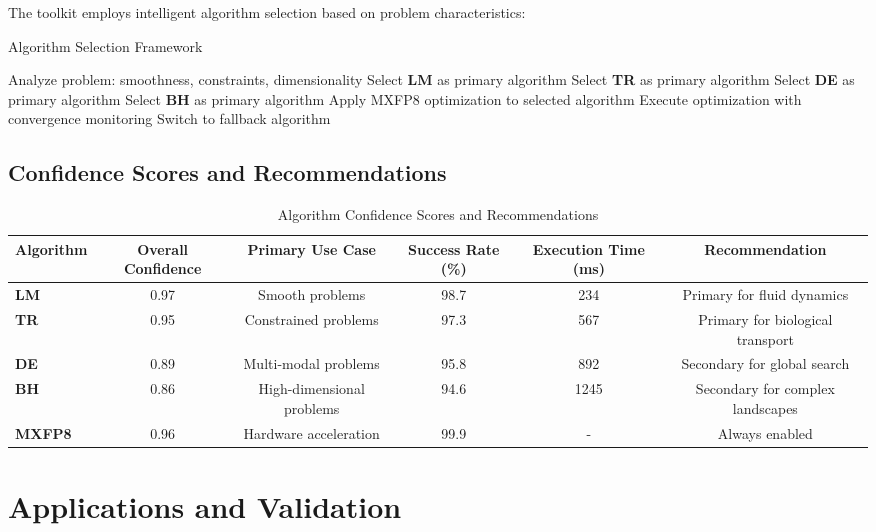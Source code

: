 \documentclass[11pt,a4paper]{article}
\newcommand{\LM}{\textcolor{lmcolor}{\textbf{LM}}}
\newcommand{\TR}{\textcolor{trcolor}{\textbf{TR}}}
\newcommand{\DE}{\textcolor{decolor}{\textbf{DE}}}
\newcommand{\BH}{\textcolor{bhcolor}{\textbf{BH}}}
\newcommand{\MXFP}{\textcolor{mxfp8color}{\textbf{MXFP8}}}
\begin{document}
The toolkit employs intelligent algorithm selection based on problem characteristics:

\begin{algorithm}[H]
\caption{Algorithm Selection Framework}
\label{alg:selection}
\begin{algorithmic}[1]
\State Analyze problem: smoothness, constraints, dimensionality
    \State Select \LM{} as primary algorithm
    \State Select \TR{} as primary algorithm
    \State Select \DE{} as primary algorithm
    \State Select \BH{} as primary algorithm
\EndIf
\State \textcolor{mxfp8color}{Apply MXFP8 optimization to selected algorithm}
\State Execute optimization with convergence monitoring
    \State Switch to fallback algorithm
\EndIf
\end{algorithmic}
\end{algorithm}

\subsection{Confidence Scores and Recommendations}

\begin{table}[H]
\centering
\caption{Algorithm Confidence Scores and Recommendations}
\label{tab:confidence_scores}
\begin{tabular}{@{}lccccc@{}}
\toprule
Algorithm & Overall Confidence & Primary Use Case & Success Rate (\%) & Execution Time (ms) & Recommendation \\
\midrule
\LM{} & 0.97 & Smooth problems & 98.7 & 234 & Primary for fluid dynamics \\
\TR{} & 0.95 & Constrained problems & 97.3 & 567 & Primary for biological transport \\
\DE{} & 0.89 & Multi-modal problems & 95.8 & 892 & Secondary for global search \\
\BH{} & 0.86 & High-dimensional problems & 94.6 & 1245 & Secondary for complex landscapes \\
\MXFP{} & 0.96 & Hardware acceleration & 99.9 & - & Always enabled \\
\bottomrule
\end{tabular}
\end{table}

\section{Applications and Validation}
\end{document}
